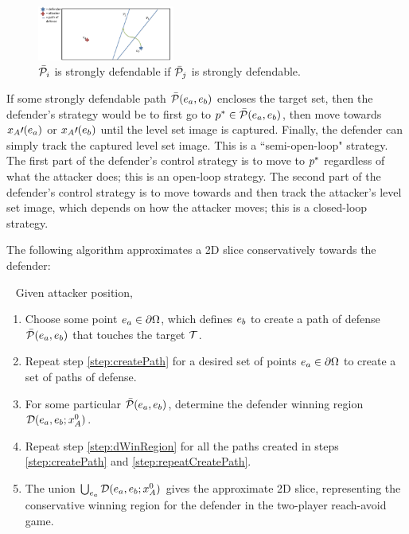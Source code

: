 \begin{figure}
\centering
\includegraphics[width=0.4\textwidth]{"fig/path behind"}
\caption{$\bar{\mathcal{P}}_{i}$ is strongly defendable if $\bar{\mathcal{P}}_{j}$ is strongly defendable.}
\label{fig:path_behind}
\end{figure}

If some strongly defendable path $\bar{\mathcal{P}}(e_a,e_b)$ encloses the target set, then the defender's strategy would be to first go to $p^*\in\bar{\mathcal{P}}(e_a,e_b)$, then move towards $x_A\prime(e_a)$ or $x_A\prime(e_b)$ until the level set image is captured. Finally, the defender can simply track the captured level set image. This is a ``semi-open-loop" strategy. The first part of the defender's control strategy is to move to $p^*$ regardless of what the attacker does; this is an open-loop strategy. The second part of the defender's control strategy is to move towards and then track the attacker's level set image, which depends on how the attacker moves; this is a closed-loop strategy.

The following algorithm approximates a 2D slice conservatively towards the defender:

\begin{alg}~ \label{alg:PD_RA}
Given attacker position,
\begin{enumerate}
\item Choose some point $e_a\in\partial\Omega$, which defines $e_b$ to create a path of defense $\bar{\mathcal{P}}(e_a,e_b)$ that touches the target $\mathcal{T}$. \label{step:createPath}
\item Repeat step \ref{step:createPath} for a desired set of points $e_a\in\partial\Omega$ to create a set of paths of defense. \label{step:repeatCreatePath}
\item For some particular $\bar{\mathcal{P}}(e_a,e_b)$, determine the defender winning region $\mathcal{D}(e_a,e_b;x_A^0)$.\label{step:dWinRegion}
\item Repeat step \ref{step:dWinRegion} for all the paths created in steps \ref{step:createPath} and \ref{step:repeatCreatePath}.
\item The union $\bigcup_{e_a} \mathcal{D}(e_a,e_b;x_A^0)$ gives the approximate 2D slice, representing the conservative winning region for the defender in the two-player reach-avoid game. \label{step:union}
\end{enumerate}
\end{alg}

